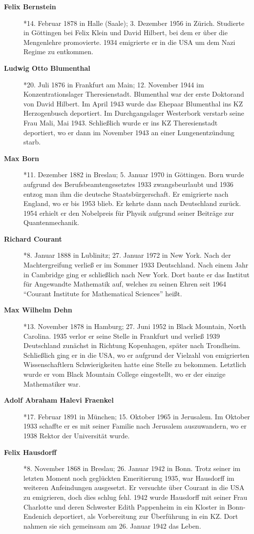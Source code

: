 \begin{description}
\item[\textbf{Felix Bernstein}] *14. Februar 1878 in Halle (Saale); 3. Dezember 1956 in Zürich. Studierte in Göttingen bei Felix Klein und David Hilbert, bei dem er über die Mengenlehre promovierte. 1934 emigrierte er in die USA um dem Nazi Regime zu entkommen.
\item[\textbf{Ludwig Otto Blumenthal}] *20. Juli 1876 in Frankfurt am Main; 12. November 1944 im Konzentrationslager Theresienstadt. Blumenthal war der erste Doktorand von David Hilbert. Im April 1943 wurde das Ehepaar Blumenthal ins KZ Herzogenbusch deportiert. Im Durchgangslager Westerbork verstarb seine Frau Mali, Mai 1943. Schließlich wurde er ins KZ Theresienstadt deportiert, wo er dann im November 1943 an einer Lungenentzündung starb.
\item[\textbf{Max Born}] *11. Dezember 1882 in Breslau; 5. Januar 1970 in Göttingen. Born wurde aufgrund des Berufsbeamtengesetztes 1933 zwangsbeurlaubt und 1936 entzog man ihm die deutsche Staatsbürgerschaft. Er emigrierte nach England, wo er bis 1953 blieb. Er kehrte dann nach Deutschland zurück. 1954 erhielt er den Nobelpreis für Physik aufgrund seiner Beiträge zur Quantenmechanik.
\item[\textbf{Richard Courant}] *8. Januar 1888 in Lublinitz; 27. Januar 1972 in New York. Nach der Machtergreifung verließ er im Sommer 1933 Deutschland. Nach einem Jahr in Cambridge ging er schließlich nach New York. Dort baute er das Institut für Angewandte Mathematik auf, welches zu seinen Ehren seit 1964 "`Courant Institute for Mathematical Sciences"' heißt.
\item[\textbf{Max Wilhelm Dehn}] *13. November 1878 in Hamburg; 27. Juni 1952 in Black Mountain, North Carolina. 1935 verlor er seine Stelle in Frankfurt und verließ 1939 Deutschland zunächst in Richtung Kopenhagen, später nach Trondheim. Schließlich ging er in die USA, wo er aufgrund der Vielzahl von emigrierten Wissenschaftlern Schwierigkeiten hatte eine Stelle zu bekommen. Letztlich wurde er vom Black Mountain College eingestellt, wo er der einzige Mathematiker war. 
\item[\textbf{Adolf Abraham Halevi Fraenkel}] *17. Februar 1891 in München; 15. Oktober 1965 in Jerusalem. Im Oktober 1933 schaffte er es mit seiner Familie nach Jerusalem auszuwandern, wo er 1938 Rektor der Universität wurde. 
\item[\textbf{Felix Hausdorff}] *8. November 1868 in Breslau; 26. Januar 1942 in Bonn. Trotz seiner im letzten Moment noch geglückten Emeritierung 1935, war Hausdorff im weiteren Anfeindungen ausgesetzt. Er versuchte über Courant in die USA zu emigrieren, doch dies schlug fehl. 1942 wurde Hausdorff mit seiner Frau Charlotte und deren Schwester Edith Pappenheim in ein Kloster in Bonn-Endenich deportiert, als Vorbereitung zur Überführung in ein KZ. Dort nahmen sie sich gemeinsam am 26. Januar 1942 das Leben.

\end{description}
